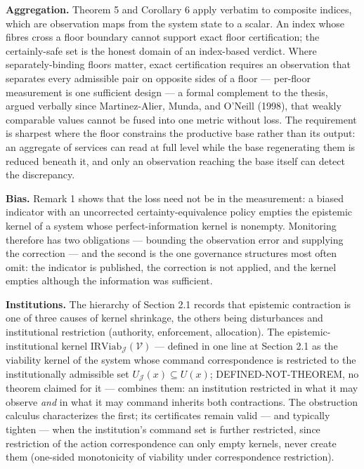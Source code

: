 \documentclass[11pt]{article}
\begin{document}
\textbf{Aggregation.} Theorem 5 and Corollary 6 apply verbatim to
composite indices, which are observation maps from the system state to a
scalar. An index whose fibres cross a floor boundary cannot support
exact floor certification; the certainly-safe set is the honest domain
of an index-based verdict. Where separately-binding floors matter, exact
certification requires an observation that separates every admissible
pair on opposite sides of a floor --- per-floor measurement is one
sufficient design --- a formal complement to the thesis, argued verbally
since Martinez-Alier, Munda, and O'Neill (1998), that weakly comparable
values cannot be fused into one metric without loss. The requirement is
sharpest where the floor constrains the productive base rather than its
output: an aggregate of services can read at full level while the base
regenerating them is reduced beneath it, and only an observation
reaching the base itself can detect the discrepancy.

\textbf{Bias.} Remark 1 shows that the loss need not be in the
measurement: a biased indicator with an uncorrected
certainty-equivalence policy empties the epistemic kernel of a system
whose perfect-information kernel is nonempty. Monitoring therefore has
two obligations --- bounding the observation error and supplying the
correction --- and the second is the one governance structures most
often omit: the indicator is published, the correction is not applied,
and the kernel empties although the information was sufficient.

\textbf{Institutions.} The hierarchy of Section 2.1 records that
epistemic contraction is one of three causes of kernel shrinkage, the
others being disturbances and institutional restriction (authority,
enforcement, allocation). The epistemic-institutional kernel
\(\mathrm{IRViab}_{\mathcal{J}}(\mathcal{V})\) --- defined in one line
at Section 2.1 as the viability kernel of the system whose command
correspondence is restricted to the institutionally admissible set
\(U_{\mathcal{J}}(x) \subseteq U(x)\); DEFINED-NOT-THEOREM, no theorem
claimed for it --- combines them: an institution restricted in what it
may observe \emph{and} in what it may command inherits both
contractions. The obstruction calculus characterizes the first; its
certificates remain valid --- and typically tighten --- when the
institution's command set is further restricted, since restriction of
the action correspondence can only empty kernels, never create them
(one-sided monotonicity of viability under correspondence restriction).
\end{document}
